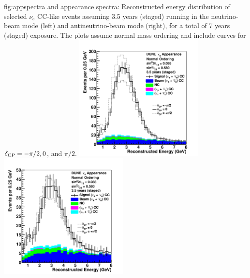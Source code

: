 \begin{dunefigure}{fig:appspectra}
{\nue and \anue appearance spectra: Reconstructed energy distribution of selected $\nu_e$ CC-like events assuming 3.5 years (staged) running in the neutrino-beam mode (left) and antineutrino-beam mode (right), for a total of 7 years (staged) exposure.  The plots assume normal mass ordering and include curves for $\delta_{\rm CP} = -\pi/2, 0$, and $\pi/2$.}
 \includegraphics[width=0.49\textwidth]{graphics/spec_app_nu_varydcp.pdf}
 \includegraphics[width=0.49\textwidth]{graphics/spec_app_anu_varydcp.pdf}
\end{dunefigure}



